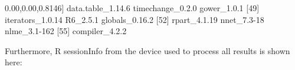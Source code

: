 \documentclass[
]{article}
\newenvironment{Shaded}{\begin{snugshade}}{\end{snugshade}}
\newcommand{\DecValTok}[1]{\textcolor[rgb]{0.00,0.00,0.81}{#1}}
\newcommand{\FloatTok}[1]{\textcolor[rgb]{0.00,0.00,0.81}{#1}}
\newcommand{\NormalTok}[1]{#1}
\begin{document}
\begin{Shaded}
\begin{Highlighting}[]
\NormalTok{[}\DecValTok{46}\NormalTok{] data.table\_1.}\FloatTok{14.6}\NormalTok{    timechange\_0.}\FloatTok{2.0}\NormalTok{     gower\_1.}\FloatTok{0.1}         
\NormalTok{[}\DecValTok{49}\NormalTok{] iterators\_1.}\FloatTok{0.14}\NormalTok{     R6\_2.}\FloatTok{5.1}\NormalTok{             globals\_0.}\FloatTok{16.2}      
\NormalTok{[}\DecValTok{52}\NormalTok{] rpart\_4.}\FloatTok{1.19}\NormalTok{         nnet\_7}\FloatTok{.3}\DecValTok{{-}18}\NormalTok{          nlme\_3}\FloatTok{.1}\DecValTok{{-}162}        
\NormalTok{[}\DecValTok{55}\NormalTok{] compiler\_4.}\FloatTok{2.2}   
\end{Highlighting}
\end{Shaded}

\normalsize

\newpage

Furthermore, R sessionInfo from the device used to process all results
is shown here:\\
\strut \\
\footnotesize
\end{document}
